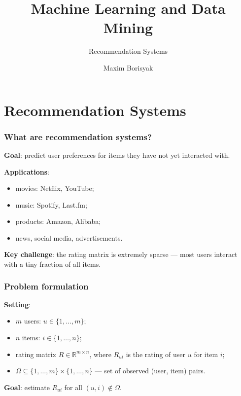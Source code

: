 \documentclass[]{beamer}
\subtitle{Recommendation Systems}
\author{Maxim Borisyak}
\institute{Constructor University Bremen}
\begin{document}
\title{Machine Learning and Data Mining}

\begin{frame}[plain]
\titlepage
\end{frame}

\section{Recommendation Systems}

\begin{frame}[fragile]
\frametitle{What are recommendation systems?}
\textbf{Goal}: predict user preferences for items they have not yet interacted with.

\textbf{Applications}:
\begin{itemize}
  \item movies: Netflix, YouTube;
  \item music: Spotify, Last.fm;
  \item products: Amazon, Alibaba;
  \item news, social media, advertisements.
\end{itemize}

\textbf{Key challenge}: the rating matrix is extremely sparse --- most users interact with a tiny fraction of all items.

\end{frame}

\begin{frame}[fragile]
\frametitle{Problem formulation}
\textbf{Setting}:
\begin{itemize}
  \item $m$ users: $u \in \{1, \dots, m\}$;
  \item $n$ items: $i \in \{1, \dots, n\}$;
  \item rating matrix $R \in \mathbb{R}^{m \times n}$, where $R_{ui}$ is the rating of user $u$ for item $i$;
  \item $\Omega \subseteq \{1,\dots,m\} \times \{1,\dots,n\}$ --- set of observed (user, item) pairs.
\end{itemize}

\textbf{Goal}: estimate $R_{ui}$ for all $(u, i) \notin \Omega$.

\end{frame}
\end{document}
